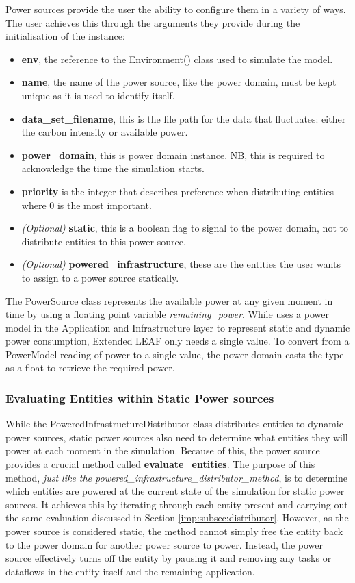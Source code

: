 \documentclass{l4proj}
\begin{document}
Power sources provide the user the ability to configure them in a variety of ways.
The user achieves this through the arguments they provide during the initialisation of the instance:
\begin{itemize}
    \item \textbf{env}, the reference to the Environment() class used to simulate the model.
    \item \textbf{name}, the name of the power source, like the power domain, must be kept unique as it is used to identify itself.
    \item \textbf{data\_set\_filename}, this is the file path for the data that fluctuates: either the carbon intensity or available power.
    \item \textbf{power\_domain}, this is power domain instance. NB, this is required to acknowledge the time the simulation starts.
    \item \textbf{priority} is the integer that describes preference when distributing entities where 0 is the most important.
    \item \textit{(Optional)} \textbf{static}, this is a boolean flag to signal to the power domain, not to distribute entities to this power source.
    \item \textit{(Optional)} \textbf{powered\_infrastructure}, these are the entities the user wants to assign to a power source statically.
\end{itemize}
The PowerSource class represents the available power at any given moment in time by using a floating point variable \textit{remaining\_power}.
While \cite{leaf2021} uses a power model in the Application and Infrastructure layer to represent static and dynamic power consumption, Extended LEAF only needs a single value.
To convert from a PowerModel reading of power to a single value, the power domain casts the type as a float to retrieve the required power.

\subsubsection{Evaluating Entities within Static Power sources}\label{imp:subsec:static-entities}
While the PoweredInfrastructureDistributor class distributes entities to dynamic power sources, static power sources also need to determine what entities they will power at each moment in the simulation.
Because of this, the power source provides a crucial method called \textbf{evaluate\_entities}.
The purpose of this method, \textit{just like the powered\_infrastructure\_distributor\_method}, is to determine which entities are powered at the current state of the simulation for static power sources.
It achieves this by iterating through each entity present and carrying out the same evaluation discussed in Section \ref{imp:subsec:distributor}.
However, as the power source is considered static, the method cannot simply free the entity back to the power domain for another power source to power.
Instead, the power source effectively turns off the entity by pausing it and removing any tasks or dataflows in the entity itself and the remaining application.
\end{document}
